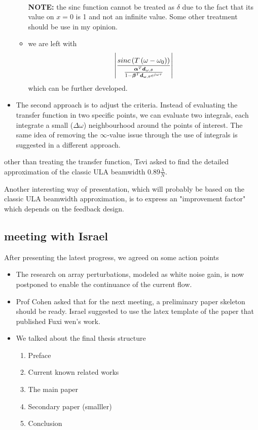 \documentclass[12pt]{article}
\begin{document}
\begin{itemize}
\begin{itemize}
        \\\textbf{NOTE:} the sinc function cannot be treated as $\delta$ due to the fact that its value on $x=0$ is 1 and not an infinite value.
        Some other treatment should be use in my opinion.
        \item we are left with 
        $$
        \left|
        \frac{
        sinc\left(T\left(\omega-\omega_{0}\right)\right)
        }{
        \frac{\boldsymbol{\alpha}^{T}\boldsymbol{d}_{\omega,\theta}
        }{
        1-\boldsymbol{\beta}^{T}\boldsymbol{d}_{\omega,\theta}e^{j\omega\tau}
        }
        }
        \right|
        $$
        which can be further developed.
    \end{itemize}
    \item The second approach is to adjust the criteria. Instead of evaluating the transfer function in two specific points, we can evaluate two integrals, each integrate a small ($\Delta\omega$) neighbourhood around the points of interest. The same idea of removing the $\infty$-value issue through the use of integrals is suggested in a different approach.
\end{itemize}
other than treating the transfer function, Tsvi asked to find the detailed approximation of the classic ULA beamwidth $0.89\frac{\lambda}{N}$.
\par Another interesting way of presentation, which will probably be based on the classic ULA beamwidth approximation, is to express an "improvement factor" which depends on the feedback design. 
\subsection{meeting with Israel}
After presenting the latest progress, we agreed on some action points
\begin{itemize}
    \item The research on array perturbations, modeled as white noise gain, is now postponed to enable the continuance of the current flow.
    \item Prof Cohen asked that for the next meeting, a preliminary paper skeleton should be ready. Israel suggested to use the latex template of the paper that published Fuxi wen's work.
    \item We talked about the final thesis structure
    \begin{enumerate}
        \item Preface
        \item Current known related works
        \item The main paper
        \item Secondary paper (smalller)
        \item Conclusion
    \end{enumerate}
\end{itemize}
\clearpage
\small
{


}
\end{document}

